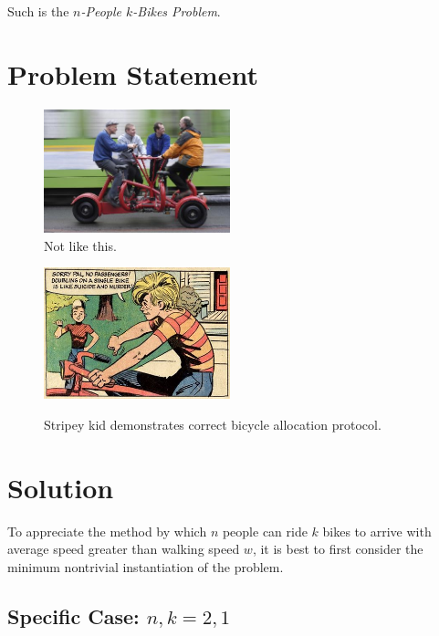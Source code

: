 \documentclass[DIV=calc, paper=a4, fontsize=11pt, twocolumn]{scrartcl}	 %
\newcommand{\initial}[1]{ %
\lettrine[lines=3,lhang=0.3,nindent=0em]{
\color{DarkGoldenrod}
{\textsf{#1}}}{}}
\newcommand\prob{$n$-People $k$-Bikes Problem}
\begin{document}
Such is the {\em \prob}.

\section{Problem Statement}



\begin{figure}[h]
	\begin{center}
	\includegraphics[width=0.48\textwidth]{conference.jpg}
	\end{center}
	\label{fig:conference}
	\caption{Not like this.}
\end{figure}
\begin{figure}[h]
	\includegraphics[width=0.48\textwidth]{suicideandmurder.jpg}
	\label{fig:conference}
	\caption{Stripey kid demonstrates correct bicycle allocation protocol.}
\end{figure}

\section{Solution}

\initial{T}o appreciate the method by which $n$ people can ride $k$ bikes to arrive with average speed greater than walking speed $w$, it is best to first consider the minimum nontrivial instantiation of the problem.

\subsection{Specific Case: $n,k = 2,1$}
\end{document}
